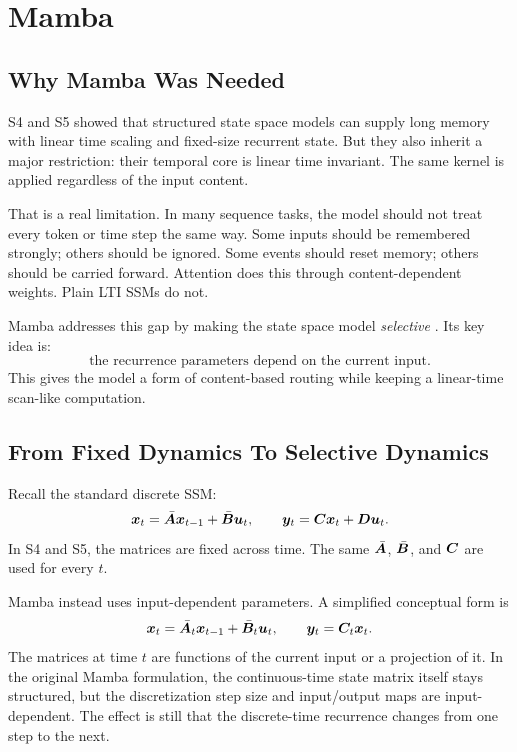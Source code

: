 \chapter{Mamba}
\label{ch:mamba}

\section{Why Mamba Was Needed}

S4 and S5 showed that structured state space models can supply long memory with linear
time scaling and fixed-size recurrent state. But they also inherit a major restriction:
their temporal core is linear time invariant. The same kernel is applied regardless of
the input content.

That is a real limitation. In many sequence tasks, the model should not treat every token
or time step the same way. Some inputs should be remembered strongly; others should be
ignored. Some events should reset memory; others should be carried forward. Attention does
this through content-dependent weights. Plain LTI SSMs do not.

Mamba addresses this gap by making the state space model \emph{selective}
\citep{gu2023mamba}. Its key idea is:
\[
  \text{the recurrence parameters depend on the current input.}
\]
This gives the model a form of content-based routing while keeping a linear-time scan-like
computation.

\section{From Fixed Dynamics To Selective Dynamics}

Recall the standard discrete SSM:
\[
  \bm{x}_t = \bar{\bm{A}}\bm{x}_{t-1} + \bar{\bm{B}}\bm{u}_t,
  \qquad
  \bm{y}_t = \bm{C}\bm{x}_t + \bm{D}\bm{u}_t.
\]
In S4 and S5, the matrices are fixed across time. The same $\bar{\bm{A}}$, $\bar{\bm{B}}$,
and $\bm{C}$ are used for every $t$.

Mamba instead uses input-dependent parameters. A simplified conceptual form is
\begin{equation}
  \bm{x}_t = \bar{\bm{A}}_t \bm{x}_{t-1} + \bar{\bm{B}}_t \bm{u}_t,
  \qquad
  \bm{y}_t = \bm{C}_t \bm{x}_t.
  \label{eq:mamba-selective-ssm}
\end{equation}
The matrices at time $t$ are functions of the current input or a projection of it. In the
original Mamba formulation, the continuous-time state matrix itself stays structured, but
the discretization step size and input/output maps are input-dependent. The effect is still
that the discrete-time recurrence changes from one step to the next.

